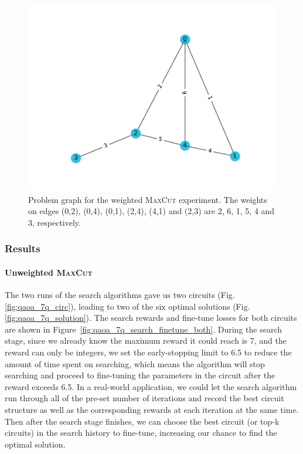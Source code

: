 \documentclass{ieeeaccess}
\begin{document}
\begin{figure}[H]
  \centering
  \includegraphics[width=0.8\linewidth]{peiyong_fig_17.pdf}
  \caption{Problem graph for the weighted \textsc{MaxCut} experiment. The weights on edges (0,2), (0,4), (0,1), (2,4), (4,1) and (2,3) are 2, 6, 1, 5, 4 and 3, respectively.}
  \label{fig:max_cut_weighted_prob}
\end{figure}

\subsubsection{Results}
\paragraph{Unweighted \textsc{MaxCut}}
The two runs of the search algorithms gave us two circuits (Fig. \ref{fig:qaoa_7q_circ}), leading to two of the six optimal solutions (Fig. \ref{fig:qaoa_7q_solution}). The search rewards and fine-tune losses for both circuits are shown in Figure~\ref{fig:qaoa_7q_search_finetune_both}. During the search stage, since we already know the maximum reward it could reach is 7, and the reward can only be integers, we set the early-stopping limit to 6.5 to reduce the amount of time spent on searching, which means the algorithm will stop searching and proceed to fine-tuning the parameters in the circuit after the reward exceeds 6.5. In a real-world application, we could let the search algorithm run through all of the pre-set number of iterations and record the best circuit structure as well as the corresponding rewards at each iteration at the same time. Then after the search stage finishes, we can choose the best circuit (or top-k circuits) in the search history to fine-tune, increasing our chance to find the optimal solution.
\end{document}
